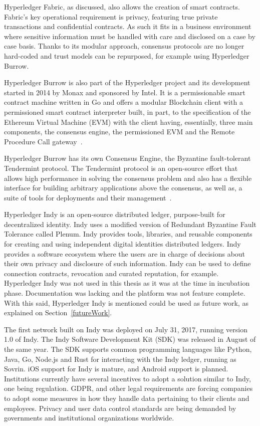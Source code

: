 Hyperledger Fabric, as discussed, also allows the creation of smart contracts.
Fabric's key operational requirement is privacy, featuring true private
transactions and confidential contracts. As such it fits in a business
environment where sensitive information must be handled with care and disclosed
on a case by case basis. Thanks to its modular approach, consensus protocols
are no longer hard-coded and trust models can be repurposed, for example using
Hyperledger Burrow.

Hyperledger Burrow is also part of the Hyperledger project and its development
started in 2014 by Monax and sponsored by Intel. It is a permissionable smart
contract machine written in Go and offers a modular Blockchain client with a
permissioned smart contract interpreter built, in part, to the specification of
the Ethereum Virtual Machine (EVM) with the client having, essentially, three
main components, the consensus engine, the permissioned EVM and the Remote
Procedure Call gateway~\cite{Kuhlman2017,HyperledgerBurrow2017}.

Hyperledger Burrow has its own Consensus Engine, the Byzantine fault-tolerant
Tendermint protocol.  The Tendermint protocol is an open-source effort that
allows high performance in solving the consensus problem and also has a
flexible interface for building arbitrary applications above the consensus, as
well as, a suite of tools for deployments and their
management~\cite{Buchman2016}.

Hyperledger Indy is an open-source distributed ledger, purpose-built for
decentralized identity. Indy uses a modified version of Redundant Byzantine
Fault Tolerance called Plenum. Indy provides tools, libraries, and reusable
components for creating and using independent digital identities distributed
ledgers. Indy provides a software ecosystem where the users are in charge of
decisions about their own privacy and disclosure of such information.  Indy can
be used to define connection contracts, revocation and curated reputation, for
example. Hyperledger Indy was not used in this thesis as it was at the time in
incubation phase. Documentation was lacking and the platform was not feature
complete. With this said, Hyperledger Indy is mentioned could be used as future
work, as explained on Section~\ref{futureWork}.

The first network built on Indy was deployed on July 31, 2017, running version
1.0 of Indy. The Indy Software Development Kit (SDK) was released in August of
the same year. The SDK supports common programming languages like Python, Java,
Go, Node.js and Rust for interacting with the Indy ledger, running as Sovrin.
iOS support for Indy is mature, and Android support is planned. Institutions
currently have several incentives to adopt a solution similar to Indy, one
being regulation. GDPR, and other legal requirements are forcing companies to
adopt some measures in how they handle data pertaining to their clients and
employees. Privacy and user data control standards are being demanded by
governments and institutional organizations worldwide.

